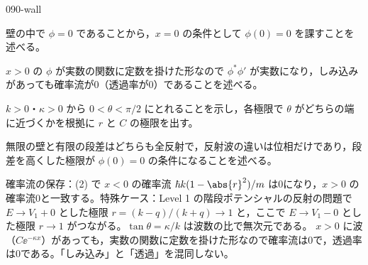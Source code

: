 \documentclass[uplatex,dvipdfmx,a4paper,11pt]{jsarticle}
\begin{document}
\begin{kaisetsu}{090-wall}
\begin{ronten}
  \item {} 壁の中で $\phi=0$ であることから，$x=0$ の条件として $\phi(0)=0$ を課すことを述べる。
  \item {} $x>0$ の $\phi$ が実数の関数に定数を掛けた形なので $\phi^{*}\phi'$ が実数になり，しみ込みがあっても確率流が0（透過率が0）であることを述べる。
  \item {} $k>0$・$\kappa>0$ から $0<\theta<\pi/2$ にとれることを示し，各極限で $\theta$ がどちらの端に近づくかを根拠に $r$ と $C$ の極限を出す。
  \item {} 無限の壁と有限の段差はどちらも全反射で，反射波の違いは位相だけであり，段差を高くした極限が $\phi(0)=0$ の条件になることを述べる。
\end{ronten}
\kenzan 確率流の保存：(2) で $x<0$ の確率流 $\hbar k(1-\abs{r}^{2})/m$ は0になり，$x>0$ の確率流0と一致する。特殊ケース：Level 1 の階段ポテンシャルの反射の問題で $E\to V_{1}+0$ とした極限 $r=(k-q)/(k+q)\to 1$ と，ここで $E\to V_{1}-0$ とした極限 $r\to 1$ がつながる。$\tan\theta=\kappa/k$ は波数の比で無次元である。
\tsumazuki $x>0$ に波（$C\ee^{-\kappa x}$）があっても，実数の関数に定数を掛けた形なので確率流は0で，透過率は0である。「しみ込み」と「透過」を混同しない。
\end{kaisetsu}
\end{document}
